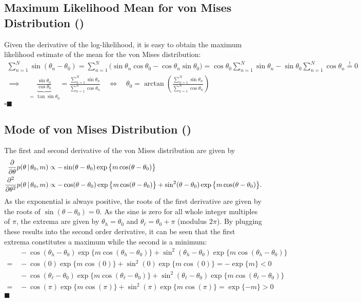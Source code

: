 \documentclass[11pt, a4paper]{scrartcl}
\newcommand{\given}{\,\vert\,}
\newcommand{\eot}{\hfill\(\blacksquare\)}
\newcommand{\qedeot}{\hfill\(\square\blacksquare\)}
\newcommand{\diffstar}{\texorpdfstring{\raisebox{-1pt}{\resizebox{!}{8pt}{\(\star\)}}}{*}}
\newcommand{\onestar}  {(\diffstar)}
\begin{document}
		\subsection{Maximum Likelihood Mean for von Mises Distribution  \onestar}
			Given the derivative of the log-likelihood, it is easy to obtain the maximum likelihood estimate of the mean for the von Mises distribution:
			\begin{gather}
				\sum_{n = 1}^{N} \sin(\theta_n - \theta_0)
					= \sum_{n = 1}^{N} \big(\! \sin\theta_n \cos\theta_0 - \cos\theta_n \sin\theta_0 \big)
					= \cos\theta_0 \sum_{n = 1}^{N} \sin\theta_n - \sin\theta_0 \sum_{n = 1}^{N} \cos\theta_n
					\overset{!}{=} 0 \\
				\implies\quad
				\underbrace{\frac{\sin\theta_0}{\cos\theta_0}}_{=\, \tan\sin\theta_0} = \frac{\sum_{n = 1}^{N} \sin\theta_n}{\sum_{n = 1}^{N} \cos\theta_n}
				\quad\iff\quad
				\theta_0 = \arctan(\frac{\sum_{n = 1}^{N} \sin\theta_n}{\sum_{n = 1}^{N} \cos\theta_n})
			\end{gather}
			\qedeot

		\subsection{Mode of von Mises Distribution  \onestar}
			The first and second derivative of the von Mises distribution are given by
			\begin{align}
				\pdv{\theta} p(\theta \given \theta_0, m)
					&\propto -\sin(\theta - \theta_0) \exp\big\{ m \cos(\theta - \theta_0) \big\} \\
				\pdv[2]{\theta} p(\theta \given \theta_0, m)
					&\propto -\cos(\theta - \theta_0) \exp\big\{ m \cos(\theta - \theta_0) \big\} + \sin^2(\theta - \theta_0) \exp\big\{ m \cos(\theta - \theta_0) \big\}.
			\end{align}
			As the exponential is always positive, the roots of the first derivative are given by the roots of \( \sin(\theta - \theta_0) = 0 \). As the sine is zero for all whole integer multiples of \(\pi\), the extrema are given by \( \theta_h = \theta_0 \) and \( \theta_\ell = \theta_0 + \pi \) (modulus \(2\pi\)). By plugging these results into the second order derivative, it can be seen that the first extrema constitutes a maximum while the second is a minimum:
			\begin{align}
				 &\, -\cos(\theta_h - \theta_0) \exp\big\{ m \cos(\theta_h - \theta_0) \big\} + \sin^2(\theta_h - \theta_0) \exp\big\{ m \cos(\theta_h - \theta_0) \big\} \\
				=&\, -\cos(0) \exp\big\{ m \cos(0) \big\} + \sin^2(0) \exp\big\{ m \cos(0) \big\}
					= -\exp\{m\}
					< 0 \\
				 &\, -\cos(\theta_\ell - \theta_0) \exp\big\{ m \cos(\theta_\ell - \theta_0) \big\} + \sin^2(\theta_\ell - \theta_0) \exp\big\{ m \cos(\theta_\ell - \theta_0) \big\} \\
				=&\, -\cos(\pi) \exp\big\{ m \cos(\pi) \big\} + \sin^2(\pi) \exp\big\{ m \cos(\pi) \big\}
					= \exp\{-m\}
					> 0
			\end{align}
			\eot
\end{document}
